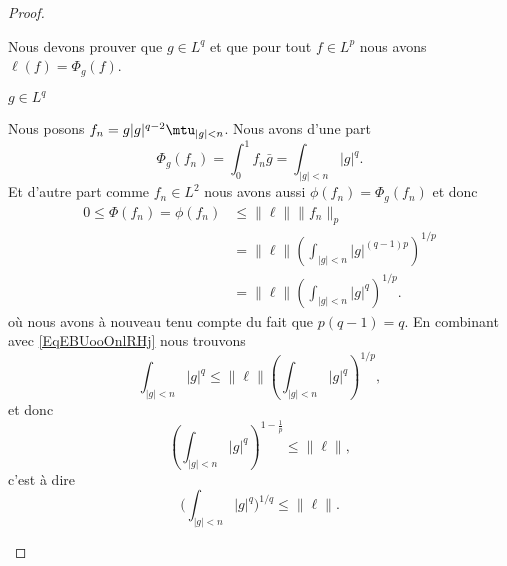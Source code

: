 \begin{proof}
\begin{subproof}
\begin{subproof}
                    Nous devons prouver que \( g\in L^q\) et que pour tout \( f\in L^p\) nous avons \( \ell(f)=\Phi_g(f)\).

                \item[\( g\in L^q\)]

                    Nous posons \( f_n=g| g |^{q-2}\mtu_{| g |<n}\). Nous avons d'une part
                    \begin{equation}    \label{EqEBUooOnlRHj}
                        \Phi_g(f_n)=\int_0^1f_n\bar g=\int_{| g |<n}| g |^q.
                    \end{equation}
                    Et d'autre part comme \( f_n\in L^2\) nous avons aussi \( \phi(f_n)=\Phi_g(f_n)\) et donc
                    \begin{subequations}
                        \begin{align}
                            0\leq \Phi(f_n)= \phi(f_n)&\leq \| \ell \|\| f_n \|_p\\
                            &=\| \ell \|\left( \int_{| g |<n}| g |^{(q-1)p} \right)^{1/p}\\
                            &=\| \ell \|\left( \int_{| g |<n}| g |^q \right)^{1/p}.
                        \end{align}
                    \end{subequations}
                    où nous avons à nouveau tenu compte du fait que \( p(q-1)=q\). En combinant avec \eqref{EqEBUooOnlRHj} nous trouvons
                    \begin{equation}
                        \int_{| g |<n}| g |^q\leq \| \ell \|\left( \int_{| g |<n}| g |^q \right)^{1/p},
                    \end{equation}
                    et donc
                    \begin{equation}
                        \left( \int_{| g |<n}| g |^{q} \right)^{1-\frac{1}{ p }}\leq \| \ell \|,
                    \end{equation}
                    c'est à dire
                    \begin{equation}
                        \Big( \int_{| g |<n}| g |^q \Big)^{1/q}\leq \| \ell \|.
                    \end{equation}


\end{subproof}
\end{subproof}
\end{proof}
